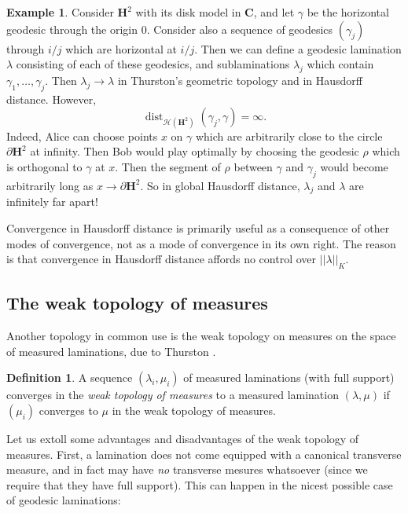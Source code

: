 \documentclass[reqno,10pt]{amsart}
\newcommand{\CC}{\mathbf{C}}
\newcommand{\Hyp}{\mathbf H}
\DeclareMathOperator{\dist}{dist}
\newcommand{\dfn}[1]{\emph{#1}\index{#1}}
\theoremstyle{definition}
\newtheorem{definition}[theorem]{Definition}
\newtheorem{example}[theorem]{Example}
\numberwithin{equation}{section}
\begin{document}
\begin{example}
Consider $\Hyp^2$ with its disk model in $\CC$, and let $\gamma$ be the horizontal geodesic through the origin $0$.
Consider also a sequence of geodesics $(\gamma_j)$ through $i/j$ which are horizontal at $i/j$.
Then we can define a geodesic lamination $\lambda$ consisting of each of these geodesics, and sublaminations $\lambda_j$ which contain $\gamma_1, \dots, \gamma_j$.
Then $\lambda_j \to \lambda$ in Thurston's geometric topology and in Hausdorff distance.
However,
$$\dist_{\mathscr H(\Hyp^2)}(\gamma_j, \gamma) = \infty.$$
Indeed, Alice can choose points $x$ on $\gamma$ which are arbitrarily close to the circle $\partial \Hyp^2$ at infinity.
Then Bob would play optimally by choosing the geodesic $\rho$ which is orthogonal to $\gamma$ at $x$.
Then the segment of $\rho$ between $\gamma$ and $\gamma_j$ would become arbitrarily long as $x \to \partial \Hyp^2$.
So in global Hausdorff distance, $\lambda_j$ and $\lambda$ are infinitely far apart!
\end{example}

Convergence in Hausdorff distance is primarily useful as a consequence of other modes of convergence, not as a mode of convergence in its own right.
The reason is that convergence in Hausdorff distance affords no control over $||\lambda||_K$.



\subsection{The weak topology of measures}
Another topology in common use is the weak topology on measures on the space of measured laminations, due to Thurston \cite[Chapter 8]{thurston1998minimal}.

\begin{definition}
A sequence $(\lambda_i, \mu_i)$ of measured laminations (with full support) converges in the \dfn{weak topology of measures} to a measured lamination $(\lambda, \mu)$ if $(\mu_i)$ converges to $\mu$ in the weak topology of measures.
\end{definition}

Let us extoll some advantages and disadvantages of the weak topology of measures.
First, a lamination does not come equipped with a canonical transverse measure, and in fact may have \emph{no} transverse mesures whatsoever (since we require that they have full support).
This can happen in the nicest possible case of geodesic laminations:
\end{document}
